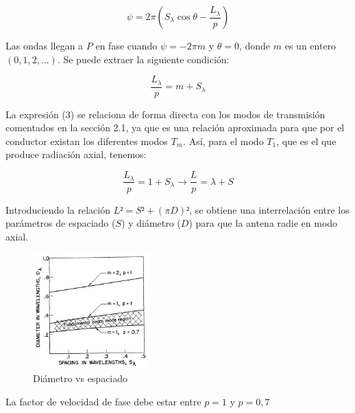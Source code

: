\documentclass[12pt]{article}
\begin{document}
\begin{equation}
	\psi=2\pi(S_{\lambda}\cos\theta-\frac{L_{\lambda}}{p})
\end{equation} 

Las ondas llegan a $P$ en fase cuando $\psi=-2\pi m$ y $\theta=0$, donde $m$ es un entero $(0,1,2,...)$. Se puede extraer la siguiente condición:

\begin{equation}
	\frac{L_{\lambda}}{p}=m+S_{\lambda}
\end{equation} 

La expresión (3) se relaciona de forma directa con los modos de transmisión comentados en la sección 2.1, ya que es una relación aproximada para que por el conductor existan los diferentes modos $T_{m}$. Así, para el modo $T_{1}$, que es el que produce radiación axial, tenemos:

\begin{equation}
	\frac{L_{\lambda}}{p}=1+S_{\lambda}\longrightarrow\frac{L}{p}=\lambda+S
\end{equation} 

Introduciendo la relación $L²=S²+(\pi D)²$, se obtiene una interrelación entre los parámetros de espaciado ($S$) y diámetro ($D$) para que la antena radie en modo axial.\\

\begin{figure}[!h]
	\centering
	\includegraphics[width=0.4\textwidth]{diametro_espaciado.png}
	\caption{Diámetro vs espaciado}
	\label{fig:diam_vs_spacing}
\end{figure}

La factor de velocidad de fase debe estar entre $p=1$ y $p=0,7$ 


\newpage


\newpage

\printglossary[type=\acronymtype]

\newpage
\printglossary[type=main]
\end{document}
